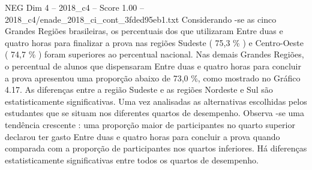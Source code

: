 \begin{textsample}{NEG Dim 4 – 2018\_c4 – Score 1.00 – 2018\_c4/enade\_2018\_ci\_cont\_3fded95eb1.txt}
Considerando -se as cinco Grandes Regiões brasileiras, os percentuais dos que utilizaram Entre duas e quatro horas para finalizar a prova nas regiões Sudeste ( 75,3 \% ) e Centro-Oeste ( 74,7 \% ) foram superiores ao percentual nacional.
Nas demais Grandes Regiões, o percentual de alunos que dispensaram Entre duas e quatro horas para concluir a prova apresentou uma proporção abaixo de 73,0 \%, como mostrado no Gráfico 4.17.
As diferenças entre a região Sudeste e as regiões Nordeste e Sul são estatisticamente significativas.
Uma vez analisadas as alternativas escolhidas pelos estudantes que se situam nos diferentes quartos de desempenho.
Observa -se uma tendência crescente : uma proporção maior de participantes no quarto superior declarou ter gasto Entre duas e quatro horas para concluir a prova quando comparada com a proporção de participantes nos quartos inferiores.
Há diferenças estatisticamente significativas entre todos os quartos de desempenho.

\end{textsample}
